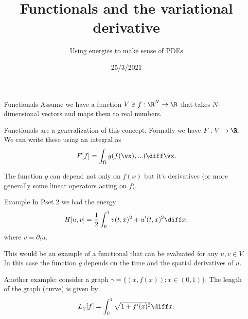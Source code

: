 

\title{Functionals and the variational derivative}
\subtitle{Using energies to make sense of PDEs}
\date{25/3/2021}
\date{}


	
	\maketitle
	

\begin{frame}{Functionals}
	Assume we have a function $ V \ni f: \R^N \to \R $ that takes $ N $-dimensional vectors and maps them to real numbers. 
	
	\pause
	Functionals are a generalization of this concept. Formally we have $ F: V \to \R $. We can write these using an integral as
	\[ F[f] = \int_{\Omega} g(f(\vx), ...)  \diff \vx. \]
	
	\pause
	The function $ g $ can depend not only on $ f(x) $ but it's derivatives (or more generally some linear operators acting on $ f $). 
\end{frame}

\begin{frame}{Example}
	In Pset 2 we had the energy
	\[ H[u,v] = \frac{1}{2} \int_{0}^{1} v(t,x)^2 + u'(t,x)^2 \diff x,  \]
	where $ v = \partial_t u $. 
	
	\pause
	This would be an example of a functional that can be evaluated for any $ u, v \in V $. In this case the function $ g $ depends on the time and the spatial derivatives of $ u $. 
	
	\pause
	Another example:
	consider a graph $ \gamma = \{ (x,f(x)) : x \in (0,1) \} $. The length of the graph (curve) is given by
	\[ L_{\gamma}[f] = \int_{0}^{1} \sqrt{1 + f'(x)^2} \diff x. \]
\end{frame}


